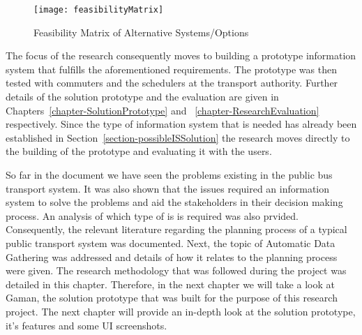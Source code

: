 \begin {figure} [H]
\centering
\texttt{[image: feasibilityMatrix]}
\caption [Feasibility Matrix of Alternative Systems/Options] {Feasibility Matrix of Alternative Systems/Options}
\label{image-FeasibilityMatrix}
\end {figure}

The focus of the research consequently moves to building a prototype information system that fulfills the aforementioned requirements. The prototype was then tested with commuters and the schedulers at the transport authority. Further details of the solution prototype and the evaluation are given in Chapters~\ref{chapter-SolutionPrototype} and ~\ref{chapter-ResearchEvaluation} respectively. Since the type of information system that is needed has already been established in Section~\ref{section-possibleISSolution} the research moves directly to the building of the prototype and evaluating it with the users.

So far in the document we have seen the problems existing in the public bus transport system. It was also shown that the issues required an information system to solve the problems and aid the stakeholders in their decision making process. An analysis of which type of \acrshort{is} is required was also prvided. Consequently, the relevant literature regarding the planning process of a typical public transport system was documented. Next, the topic of Automatic Data Gathering was addressed and details of how it relates to the planning process were given. The research methodology that was followed during the project was detailed in this chapter. Therefore, in the next chapter we will take a look at Gaman, the solution prototype that was built for the purpose of this research project. The next chapter will provide an in-depth look at the solution prototype, it's features and some UI screenshots.









